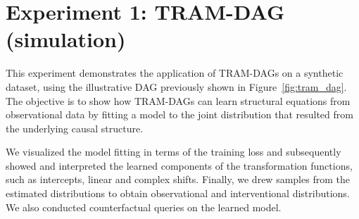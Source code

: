 % 
% 

% 
% 


% 






\section{Experiment 1: TRAM-DAG (simulation)} \label{sec:methods_experiment1}

This experiment demonstrates the application of TRAM-DAGs on a synthetic dataset, using the illustrative DAG previously shown in Figure~\ref{fig:tram_dag}. The objective is to show how TRAM-DAGs can learn structural equations from observational data by fitting a model to the joint distribution that resulted from the underlying causal structure.

We visualized the model fitting in terms of the training loss and subsequently showed and interpreted the learned components of the transformation functions, such as intercepts, linear and complex shifts. Finally, we drew samples from the estimated distributions to obtain observational and interventional distributions. We also conducted counterfactual queries on the learned model.

